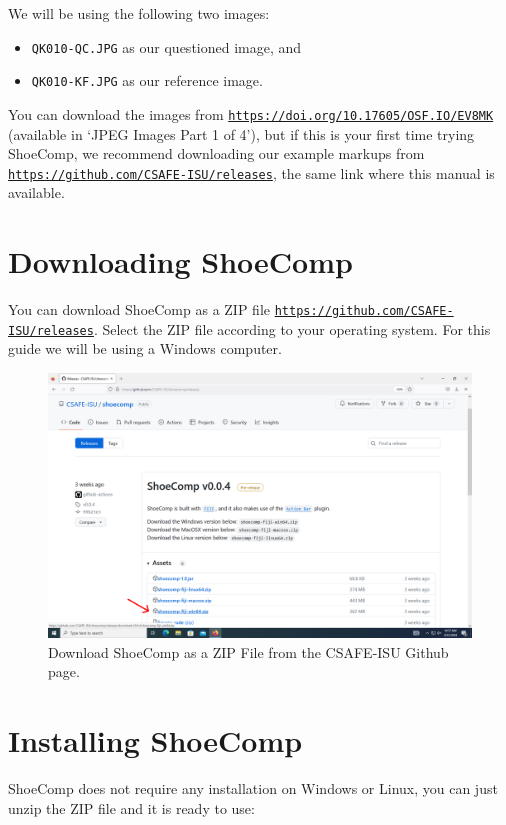 \documentclass[a4paper, oneside]{memoir}
\newcommand{\selfref}[1]{\texttt{\href{#1}{#1}}}
\begin{document}
We will be using the following two images:

\begin{itemize}
	\item \texttt{QK010-QC.JPG} as our questioned image, and
	\item \texttt{QK010-KF.JPG} as our reference image.
\end{itemize}

You can download the images from \selfref{https://doi.org/10.17605/OSF.IO/EV8MK}
(available in `JPEG Images Part 1 of 4'), but if this is your first time trying ShoeComp,
we recommend downloading our example markups from
\selfref{https://github.com/CSAFE-ISU/releases}, the same link where this manual is
available. 

\section{Downloading ShoeComp}

You can download ShoeComp as a ZIP file \selfref{https://github.com/CSAFE-ISU/releases}.
Select the ZIP file according to your operating system. For this guide we will be using a
Windows computer.

\begin{figure}[htbp]
\begin{center}
	\includegraphics[width=0.8\linewidth]{images/step_1-anno.png}
\end{center}
\caption{Download ShoeComp as a ZIP File from the CSAFE-ISU Github page.}
\label{fig:step1}
\end{figure}

\section{Installing ShoeComp}

ShoeComp does not require any installation on Windows or Linux, you can just unzip the ZIP
file and it is ready to use: 
\end{document}
